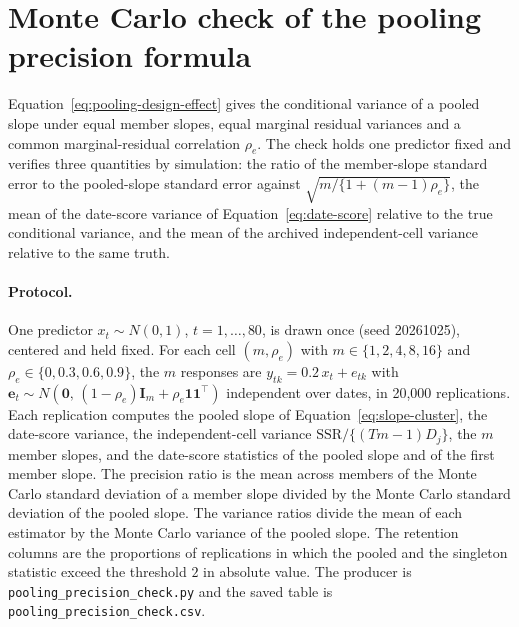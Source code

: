 \documentclass[11pt,a4paper]{article}
\begin{document}
\FloatBarrier

\section{Monte Carlo check of the pooling precision formula}\label{app:precision-check}

Equation~\eqref{eq:pooling-design-effect} gives the conditional variance of a
pooled slope under equal member slopes, equal marginal residual variances and a
common marginal-residual correlation $\rho_e$. The check holds one predictor
fixed and verifies three quantities by simulation: the ratio of the member-slope
standard error to the pooled-slope standard error against
$\sqrt{m/\{1+(m-1)\rho_e\}}$, the mean of the date-score variance of
Equation~\eqref{eq:date-score} relative to the true conditional variance, and
the mean of the archived independent-cell variance relative to the same truth.

\paragraph{Protocol.}
One predictor $x_t\sim N(0,1)$, $t=1,\ldots,80$, is drawn once (seed 20261025),
centered and held fixed. For each cell $(m,\rho_e)$ with $m\in\{1,2,4,8,16\}$
and $\rho_e\in\{0,0.3,0.6,0.9\}$, the $m$ responses are
$y_{tk}=0.2\,x_t+e_{tk}$ with $\bm e_t\sim N(\bm0,\,(1-\rho_e)\bm I_m+\rho_e\bm1\bm1^\top)$
independent over dates, in 20,000 replications. Each replication
computes the pooled slope of Equation~\eqref{eq:slope-cluster}, the date-score
variance, the independent-cell variance $\mathrm{SSR}/\{(Tm-1)D_j\}$, the $m$
member slopes, and the date-score statistics of the pooled slope and of the
first member slope. The precision ratio is the mean across members of the
Monte Carlo standard deviation of a member slope divided by the Monte Carlo
standard deviation of the pooled slope. The variance ratios divide the mean of
each estimator by the Monte Carlo variance of the pooled slope. The retention
columns are the proportions of replications in which the pooled and the
singleton statistic exceed the threshold $2$ in absolute value. The producer
is \nolinkurl{pooling_precision_check.py} and the saved table is
\nolinkurl{pooling_precision_check.csv}.
\end{document}
